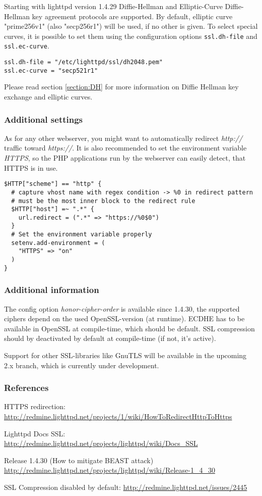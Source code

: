Starting with lighttpd version 1.4.29 Diffie-Hellman and Elliptic-Curve Diffie-Hellman key agreement protocols are supported.
By default, elliptic curve "prime256v1" (also "secp256r1") will be used, if no other is given.
To select special curves, it is possible to set them using the configuration options \verb|ssl.dh-file| and \verb|ssl.ec-curve|.
\begin{lstlisting}
ssl.dh-file = "/etc/lighttpd/ssl/dh2048.pem"
ssl.ec-curve = "secp521r1"
\end{lstlisting}
Please read section \ref{section:DH} for more information on Diffie Hellman key exchange and elliptic curves.

\subsubsection{Additional settings}
As for any other webserver, you might want to automatically redirect \emph{http://}
traffic toward \emph{https://}. It is also recommended to set the environment variable
\emph{HTTPS}, so the PHP applications run by the webserver can easily detect,
that HTTPS is in use.

\begin{lstlisting}
$HTTP["scheme"] == "http" {
  # capture vhost name with regex condition -> %0 in redirect pattern
  # must be the most inner block to the redirect rule
  $HTTP["host"] =~ ".*" {
    url.redirect = (".*" => "https://%0$0")
  }
  # Set the environment variable properly
  setenv.add-environment = (
    "HTTPS" => "on"
  )
}
\end{lstlisting}


\subsubsection{Additional information} 
The config option \emph{honor-cipher-order} is available since 1.4.30, the
supported ciphers depend on the used OpenSSL-version (at runtime). ECDHE has to
be available in OpenSSL at compile-time, which should be default. SSL
compression should by deactivated by default at compile-time (if not, it's
active).

Support for other SSL-libraries like GnuTLS will be available in the upcoming
2.x branch, which is currently under development.


\subsubsection{References} 
\begin{itemize*}
  \item HTTPS redirection: \url{http://redmine.lighttpd.net/projects/1/wiki/HowToRedirectHttpToHttps}
  \item Lighttpd Docs SSL: \url{http://redmine.lighttpd.net/projects/lighttpd/wiki/Docs\_SSL}
  \item Release 1.4.30 (How to mitigate BEAST attack) \url{http://redmine.lighttpd.net/projects/lighttpd/wiki/Release-1\_4\_30}
  \item SSL Compression disabled by default: \url{http://redmine.lighttpd.net/issues/2445}
\end{itemize*}


